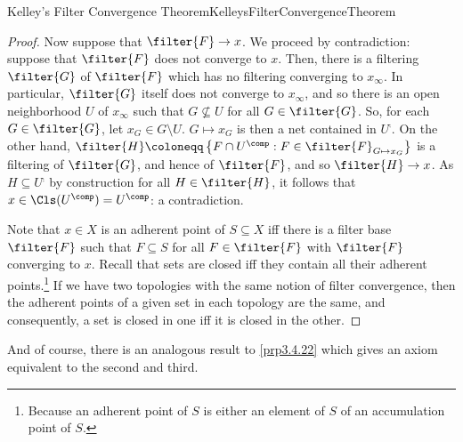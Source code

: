 \begin{thm}{Kelley's Filter Convergence Theorem}{KelleysFilterConvergenceTheorem}
\begin{proof}
Now suppose that $\filter{F}\to x$.  We proceed by contradiction:  suppose that $\filter{F}$ does not converge to $x$.  Then, there is a filtering $\filter{G}$ of $\filter{F}$ which has no filtering converging to $x_{\infty}$.  In particular, $\filter{G}$ itself does not converge to $x_{\infty}$, and so there is an open neighborhood $U$ of $x_{\infty}$ such that $G\not \subseteq U$ for all $G\in \filter{G}$.  So, for each $G\in \filter{G}$, let $x_G\in G\setminus U$.  $G\mapsto x_G$ is then a net contained in $U^{\comp}$.  On the other hand, $\filter{H}\coloneqq \left\{ F\cap U^{\comp}:F\in \filter{F}_{G\mapsto x_G}\right\}$ is a filtering of $\filter{G}$, and hence of $\filter{F}$, and so $\filter{H}\to x$.  As $H\subseteq U^{\comp}$ by construction for all $H\in \filter{H}$, it follows that $x\in \Cls (U^{\comp})=U^{\comp}$:  a contradiction.

Note that $x\in X$ is an adherent point of $S\subseteq X$ iff there is a filter base $\filter{F}$ such that $F\subseteq S$ for all $F\in \filter{F}$ with $\filter{F}$ converging to $x$.  Recall that sets are closed iff they contain all their adherent points.\footnote{Because an adherent point of $S$ is either an element of $S$ of an accumulation point of $S$.}  If we have two topologies with the same notion of filter convergence, then the adherent points of a given set in each topology are the same, and consequently, a set is closed in one iff it is closed in the other.
\end{proof}
\end{thm}
And of course, there is an analogous result to \cref{prp3.4.22} which gives an axiom equivalent to the second and third.
